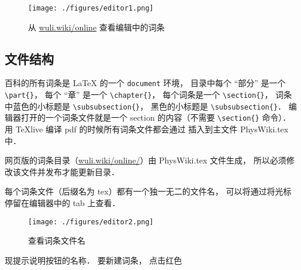 \begin{figure}[ht]
\centering
\texttt{[image: ./figures/editor1.png]}
\caption{从 \href{http://wuli.wiki/online}{wuli.wiki/online} 查看编辑中的词条} \label{editor_fig1}
\end{figure}

\subsection{文件结构}

百科的所有词条是 LaTeX 的一个 \lstinline|document| 环境， 目录中每个 “部分” 是一个 \lstinline|\part{}|， 每个 “章” 是一个 \lstinline|\chapter{}|， 每个词条是一个 \lstinline|\section{}|， 词条中蓝色的小标题是 \lstinline|\subsubsection{}|， 黑色的小标题是 \lstinline|\subsubsection{}|． 编辑器打开的一个词条文件就是一个 section 的内容（不需要 \lstinline|\section{}| 命令）． 用 TeXlive 编译 pdf 的时候所有词条文件都会通过 \lstinline|| 插入到主文件 PhysWiki.tex 中．

网页版的词条目录（\href{http://wuli.wiki/online/}{wuli.wiki/online/}）由 PhysWiki.tex 文件生成， 所以必须修改该文件并发布才能更新目录．

每个词条文件（后缀名为 tex）都有一个独一无二的文件名， 可以将通过将光标停留在编辑器中的 tab 上查看．

\begin{figure}[ht]
\centering
\texttt{[image: ./figures/editor2.png]}
\caption{查看词条文件名} \label{editor_fig2}
\end{figure}现提示说明按钮的名称． 要新建词条， 点击红色

